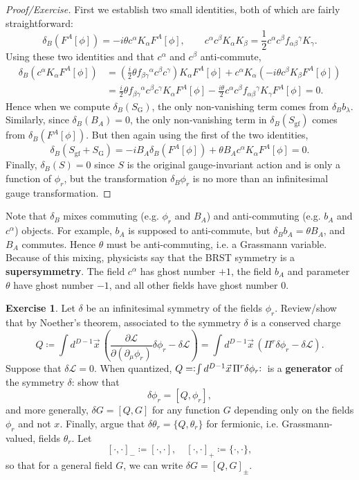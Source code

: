 \documentclass{report}
\theoremstyle{plain}
\theoremstyle{definition}
\newtheorem{exercise}{Exercise}[section]
\theoremstyle{remark}
\newcommand{\di}{\partial}
\newcommand{\NO}[1]{\vcentcolon\mathrel{#1}\vcentcolon\,}
\newcommand{\cL}{\mathcal{L}}
\newcommand{\pder}[2]{\frac{\partial #1}{\partial #2}}
\begin{document}
\begin{proof}[Proof/Exercise]
  First we establish two small identities, both of which are fairly
  straightforward:
  \[ \delta_B(F^A[\phi]) = -i\theta c^\alpha K_\alpha F^A[\phi], \qquad c^\alpha c^\beta K_\alpha K_\beta = \frac{1}{2} c^\alpha c^\beta f_{\alpha\beta}{}^\gamma K_\gamma. \]
  Using these two identities and that $c^\alpha$ and $c^\beta$
  anti-commute,
  \begin{align*}
    \delta_B(c^\alpha K_\alpha F^A[\phi])
    &= \left(\frac{i}{2}\theta f_{\beta\gamma}{}^\alpha c^\beta c^\gamma\right) K_\alpha F^A[\phi] + c^\alpha K_\alpha (-i\theta c^\beta K_\beta F^A[\phi]) \\
    &= \frac{i}{2}\theta f_{\beta\gamma}{}^\alpha c^\beta c^\gamma K_\alpha F^A[\phi] - \frac{i\theta}{2} c^\alpha c^\beta f_{\alpha\beta}{}^\gamma K_\gamma F^A[\phi] = 0.
  \end{align*}
  Hence when we compute $\delta_B(S_{\text{G}})$, the only
  non-vanishing term comes from $\delta_B b_\lambda$. Similarly, since
  $\delta_B(B_A) = 0$, the only non-vanishing term in
  $\delta_B(S_{\text{gf}})$ comes from $\delta_B(F^A[\phi])$. But then
  again using the first of the two identities,
  \[ \delta_B(S_{\text{gf}} + S_{\text{G}}) = -iB_A \delta_B(F^A[\phi]) + \theta B_A c^\alpha K_\alpha F^A[\phi] = 0. \]
  Finally, $\delta_B(S) = 0$ since $S$ is the original gauge-invariant
  action and is only a function of $\phi_r$, but the transformation
  $\delta_B \phi_r$ is no more than an infinitesimal gauge
  transformation.
\end{proof}

Note that $\delta_B$ mixes commuting (e.g. $\phi_r$ and $B_A$) and
anti-commuting (e.g. $b_A$ and $c^\alpha$) objects. For example, $b_A$
is supposed to anti-commute, but $\delta_B b_A = \theta B_A$, and
$B_A$ commutes. Hence $\theta$ must be anti-commuting, i.e. a
Grassmann variable. Because of this mixing, physicists say that the
BRST symmetry is a {\bf supersymmetry}. The field $c^\alpha$ has ghost
number $+1$, the field $b_A$ and parameter $\theta$ have ghost number
$-1$, and all other fields have ghost number $0$.

\begin{exercise}
  Let $\delta$ be an infinitesimal symmetry of the fields $\phi_r$.
  Review/show that by Noether's theorem, associated to the symmetry
  $\delta$ is a conserved charge
  \[ Q \coloneqq \int d^{D-1}\vec{x} \, \left(\pder{\cL}{(\di_\mu \phi_r)} \delta \phi_r - \delta \cL\right) = \int d^{D-1}\vec{x} \, \left(\Pi^r \delta \phi_r - \delta \cL\right). \]
  Suppose that $\delta \cL = 0$. When quantized, $Q = \NO{\int
    d^{D-1}\vec{x}\, \Pi^r \delta \phi_r}$ is a {\bf generator} of the
  symmetry $\delta$: show that
  \[ \delta \phi_r = [Q, \phi_r], \]
  and more generally, $\delta G = [Q, G]$ for any function $G$
  depending only on the fields $\phi_r$ and not $x$. Finally, argue
  that $\delta \theta_r = \{Q, \theta_r\}$ for fermionic, i.e.
  Grassmann-valued, fields $\theta_r$. Let
  \[ [\cdot, \cdot]_- \coloneqq [\cdot, \cdot], \quad [\cdot, \cdot]_+ \coloneqq \{\cdot, \cdot\}, \]
  so that for a general field $G$, we can write $\delta G = [Q,
    G]_{\pm}$.
\end{exercise}
\end{document}
